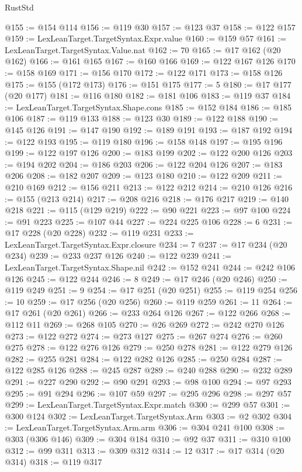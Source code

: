 \begin{lexlean}{RustStd}
\begin{coremodule}
{\begin{coremodule}
{{{{{{{{{{{{{{{{{{{{{{{{{{{{{{{{{{{{{{{{{{{{{{{{{{{{{{{{{{{{{{{{{{{{@155 := @154 @114
@156 := @119 @30
@157 := @123 @37
@158 := @122 @157
@159 := LexLeanTarget.TargetSyntax.Expr.value
@160 := @159 @57
@161 := LexLeanTarget.TargetSyntax.Value.nat
@162 := 70
@165 := @17 @162 (@20 @162)
@166 := @161 @165
@167 := @160 @166
@169 := @122 @167 @126
@170 := @158 @169
@171 := @156 @170
@172 := @122 @171
@173 := @158 @126
@175 := @155 (@172 @173)
@176 := @151 @175
@177 := 5
@180 := @17 @177 (@20 @177)
@181 := @116 @180
@182 := @181 @106
@183 := @119 @37
@184 := LexLeanTarget.TargetSyntax.Shape.cons
@185 := @152 @184
@186 := @185 @106
@187 := @119 @133
@188 := @123 @30
@189 := @122 @188
@190 := @145 @126
@191 := @147 @190
@192 := @189 @191
@193 := @187 @192
@194 := @122 @193
@195 := @119 @180
@196 := @158 @148
@197 := @195 @196
@199 := @122 @197 @126
@200 := @183 @199
@202 := @122 @200 @126
@203 := @194 @202
@204 := @186 @203
@206 := @122 @204 @126
@207 := @183 @206
@208 := @182 @207
@209 := @123 @180
@210 := @122 @209
@211 := @210 @169
@212 := @156 @211
@213 := @122 @212
@214 := @210 @126
@216 := @155 (@213 @214)
@217 := @208 @216
@218 := @176 @217
@219 := @140 @218
@221 := @115 (@129 @219)
@222 := @90 @221
@223 := @97 @100
@224 := @91 @223
@225 := @107 @44
@227 := @224 @225 @106
@228 := 6
@231 := @17 @228 (@20 @228)
@232 := @119 @231
@233 := LexLeanTarget.TargetSyntax.Expr.closure
@234 := 7
@237 := @17 @234 (@20 @234)
@239 := @233 @237 @126
@240 := @122 @239
@241 := LexLeanTarget.TargetSyntax.Shape.nil
@242 := @152 @241
@244 := @242 @106 @126
@245 := @122 @244
@246 := 8
@249 := @17 @246 (@20 @246)
@250 := @119 @249
@251 := 9
@254 := @17 @251 (@20 @251)
@255 := @119 @254
@256 := 10
@259 := @17 @256 (@20 @256)
@260 := @119 @259
@261 := 11
@264 := @17 @261 (@20 @261)
@266 := @233 @264 @126
@267 := @122 @266
@268 := @112 @11
@269 := @268 @105
@270 := @26 @269
@272 := @242 @270 @126
@273 := @122 @272
@274 := @273 @127
@275 := @267 @274
@276 := @260 @275
@278 := @122 @276 @126
@279 := @250 @278
@281 := @122 @279 @126
@282 := @255 @281
@284 := @122 @282 @126
@285 := @250 @284
@287 := @122 @285 @126
@288 := @245 @287
@289 := @240 @288
@290 := @232 @289
@291 := @227 @290
@292 := @90 @291
@293 := @98 @100
@294 := @97 @293
@295 := @91 @294
@296 := @107 @59
@297 := @295 @296
@298 := @297 @57
@299 := LexLeanTarget.TargetSyntax.Expr.match
@300 := @299 @57
@301 := @300 @124
@302 := LexLeanTarget.TargetSyntax.Arm
@303 := @2 @302
@304 := LexLeanTarget.TargetSyntax.Arm.arm
@306 := @304 @241 @100
@308 := @303 (@306 @146)
@309 := @304 @184
@310 := @92 @37
@311 := @310 @100
@312 := @99 @311
@313 := @309 @312
@314 := 12
@317 := @17 @314 (@20 @314)
@318 := @119 @317
}}}}}}}}}}}}}}}}}}}}}}}}}}}}}}}}}}}}}}}}}}}}}}}}}}}}}}}}}}}}}}}}}}}}
\end{coremodule}}
\end{coremodule}
\end{lexlean}
